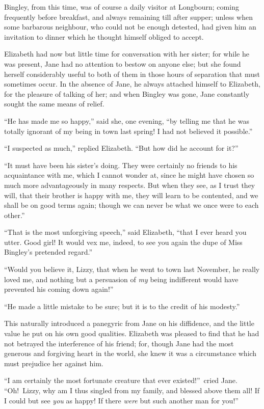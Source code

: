\documentclass[12pt,english]{book}
\begin{document}
Bingley, from this time, was of course a daily visitor at Longbourn;
coming frequently before breakfast, and always remaining till after
supper; unless when some barbarous neighbour, who could not be enough
detested, had given him an invitation to dinner which he thought himself
obliged to accept.

Elizabeth had now but little time for conversation with her sister;
for while he was present, Jane had no attention to bestow on anyone
else; but she found herself considerably useful to both of them in
those hours of separation that must sometimes occur. In the absence
of Jane, he always attached himself to Elizabeth, for the pleasure
of talking of her; and when Bingley was gone, Jane constantly sought
the same means of relief.

{}``He has made me so happy,'' said she, one evening, {}``by telling
me that he was totally ignorant of my being in town last spring! I
had not believed it possible.''

{}``I suspected as much,'' replied Elizabeth. {}``But how did he
account for it?''\ 

{}``It must have been his sister's doing. They were certainly no
friends to his acquaintance with me, which I cannot wonder at, since
he might have chosen so much more advantageously in many respects.
But when they see, as I trust they will, that their brother is happy
with me, they will learn to be contented, and we shall be on good
terms again; though we can never be what we once were to each other.''

{}``That is the most unforgiving speech,'' said Elizabeth, {}``that
I ever heard you utter. Good girl! It would vex me, indeed, to see
you again the dupe of Miss Bingley's pretended regard.''

{}``Would you believe it, Lizzy, that when he went to town last November,
he really loved me, and nothing but a persuasion of \textit{my} being
indifferent would have prevented his coming down again!''

{}``He made a little mistake to be sure; but it is to the credit
of his modesty.''

This naturally introduced a panegyric from Jane on his diffidence,
and the little value he put on his own good qualities. Elizabeth was
pleased to find that he had not betrayed the interference of his friend;
for, though Jane had the most generous and forgiving heart in the
world, she knew it was a circumstance which must prejudice her against
him.

{}``I am certainly the most fortunate creature that ever existed!''\
cried Jane. {}``Oh!\ Lizzy, why am I thus singled from my family,
and blessed above them all! If I could but see \textit{you} as happy!
If there \textit{were} but such another man for you!''
\end{document}
